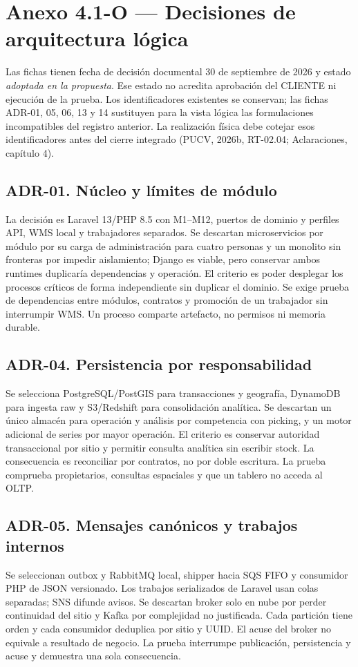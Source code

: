 \clearpage
\section*{Anexo 4.1-O --- Decisiones de arquitectura lógica}
\label{anx:O}
Las fichas tienen fecha de decisión documental 30 de septiembre de 2026 y estado \emph{adoptada en la propuesta}. Ese estado no acredita aprobación del CLIENTE ni ejecución de la prueba. Los identificadores existentes se conservan; las fichas ADR-01, 05, 06, 13 y 14 sustituyen para la vista lógica las formulaciones incompatibles del registro anterior. La realización física debe cotejar esos identificadores antes del cierre integrado (PUCV, 2026b, RT-02.04; Aclaraciones, capítulo 4).

\subsection*{ADR-01. Núcleo y límites de módulo}
La decisión es Laravel 13/PHP 8.5 con M1--M12, puertos de dominio y perfiles API, WMS local y trabajadores separados. Se descartan microservicios por módulo por su carga de administración para cuatro personas y un monolito sin fronteras por impedir aislamiento; Django es viable, pero conservar ambos runtimes duplicaría dependencias y operación. El criterio es poder desplegar los procesos críticos de forma independiente sin duplicar el dominio. Se exige prueba de dependencias entre módulos, contratos y promoción de un trabajador sin interrumpir WMS. Un proceso comparte artefacto, no permisos ni memoria durable.

\subsection*{ADR-04. Persistencia por responsabilidad}
Se selecciona PostgreSQL/PostGIS para transacciones y geografía, DynamoDB para ingesta raw y S3/Redshift para consolidación analítica. Se descartan un único almacén para operación y análisis por competencia con picking, y un motor adicional de series por mayor operación. El criterio es conservar autoridad transaccional por sitio y permitir consulta analítica sin escribir stock. La consecuencia es reconciliar por contratos, no por doble escritura. La prueba comprueba propietarios, consultas espaciales y que un tablero no acceda al OLTP.

\subsection*{ADR-05. Mensajes canónicos y trabajos internos}
Se seleccionan outbox y RabbitMQ local, shipper hacia SQS FIFO y consumidor PHP de JSON versionado. Los trabajos serializados de Laravel usan colas separadas; SNS difunde avisos. Se descartan broker solo en nube por perder continuidad del sitio y Kafka por complejidad no justificada. Cada partición tiene orden y cada consumidor deduplica por sitio y UUID. El acuse del broker no equivale a resultado de negocio. La prueba interrumpe publicación, persistencia y acuse y demuestra una sola consecuencia.

